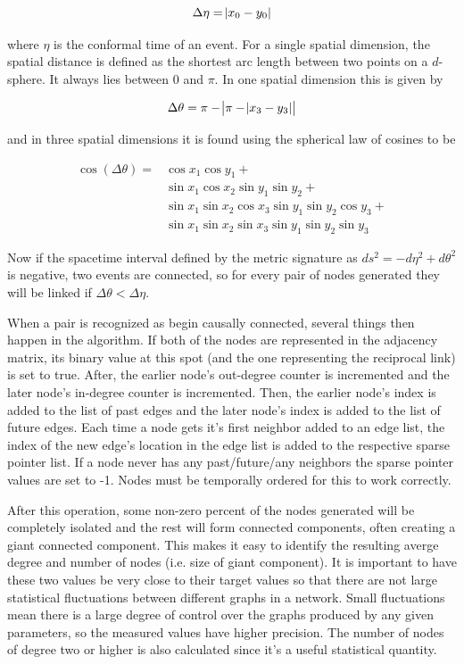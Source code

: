 \documentclass[preprint,notitlepage,amsmath,amssymb,floatfix]{revtex4-1}
\begin{document}
\begin{equation}
\Delta\eta = \abs{x_0 - y_0}
\end{equation}

\noindent where $\eta$ is the conformal time of an event.  
For a single spatial dimension, the spatial distance is defined as the shortest arc length between two points on a $d$-sphere.  
It always lies between 0 and $\pi$.
In one spatial dimension this is given by

\begin{equation}
\Delta\theta = \pi - \abs{\pi - \abs{x_3 - y_3}}
\end{equation}

\noindent and in three spatial dimensions it is found using the spherical law of cosines to be

\begin{equation}
\begin{split}
\cos\left(\Delta\theta\right) = &\cos x_1\cos y_1 + \\
  &\sin x_1\cos x_2\sin y_1\sin y_2 + \\
  &\sin x_1\sin x_2\cos x_3\sin y_1\sin y_2\cos y_3 + \\
  &\sin x_1\sin x_2\sin x_3\sin y_1\sin y_2\sin y_3
\end{split}
\end{equation}

\noindent Now if the spacetime interval defined by the metric signature as $ds^2 = -d\eta^2 + d\theta^2$ is negative, two events are connected, so for every pair of nodes generated they will be linked if $\Delta\theta < \Delta\eta$.  \par
When a pair is recognized as begin causally connected, several things then happen in the algorithm.
If both of the nodes are represented in the adjacency matrix, its binary value at this spot (and the one representing the reciprocal link) is set to true.
After, the earlier node's out-degree counter is incremented and the later node's in-degree counter is incremented.
Then, the earlier node's index is added to the list of past edges and the later node's index is added to the list of future edges.
Each time a node gets it's first neighbor added to an edge list, the index of the new edge's location in the edge list is added to the respective sparse pointer list.
If a node never has any past/future/any neighbors the sparse pointer values are set to -1.
Nodes must be temporally ordered for this to work correctly. \par
After this operation, some non-zero percent of the nodes generated will be completely isolated and the rest will form connected components, often creating a giant connected component.
This makes it easy to identify the resulting averge degree and number of nodes (i.e. size of giant component).  
It is important to have these two values be very close to their target values so that there are not large statistical fluctuations between different graphs in a network.
Small fluctuations mean there is a large degree of control over the graphs produced by any given parameters, so the measured values have higher precision.
The number of nodes of degree two or higher is also calculated since it's a useful statistical quantity.
\end{document}
